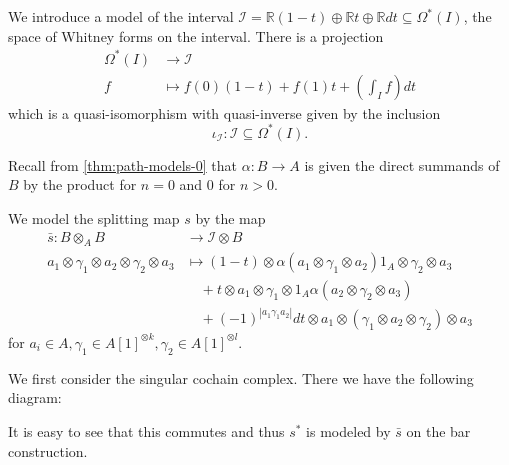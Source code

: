\documentclass{scrartcl}
\theoremstyle{plain}
\theoremstyle{definition}
\newtheorem{remark}[theorem]{Remark}
\newcommand{\R}{\mathbb R}
\newcommand{\Z}{\mathbb Z}
\newcommand{\abs}[1]{\left\lvert#1\right\rvert}
\renewcommand{\subset}{\subseteq}
\begin{document}

We introduce a model of the interval $\mathcal I = \R (1-t) \oplus \R t \oplus \R dt\subset \Omega^*(I)$, the space of Whitney forms on the interval. There is a projection 
\begin{align*}
    \Omega^*(I) &\to \mathcal I\\
    f&\mapsto f(0)(1-t) + f(1) t + \left(\int_I f\right) dt
\end{align*}
which is a quasi-isomorphism with quasi-inverse given by the inclusion $$\iota_{\mathcal I}\colon \mathcal I \subset \Omega^*(I).$$ 

Recall from \cref{thm:path-models-0} that $\alpha\colon B\to A$ is given the direct summands of $B$ by the product for $n=0$ and $0$ for $n>0$.

We model the splitting map $s$ by the map 
\begin{align*}
    \bar s \colon B\otimes_A B&\to \mathcal I\otimes B \\
    a_1 \otimes \gamma_1 \otimes a_2 \otimes \gamma_2 \otimes a_3 &\mapsto  (1-t) \otimes \alpha (a_1 \otimes \gamma_1 \otimes a_2)1_A \otimes \gamma_2 \otimes a_3 \\
    &\quad+ t\otimes a_1 \otimes \gamma_1 \otimes 1_A \alpha (a_2 \otimes \gamma_2 \otimes a_3)  \\
    &\quad +  (-1) ^{\abs{a_1\gamma_1a_2}} dt\otimes a_1 \otimes (\gamma_1\otimes a_2\otimes \gamma_2) \otimes a_3
\end{align*}
for $a_i\in A, \gamma_1\in A[1]^{\otimes k}, \gamma_2\in A[1]^{\otimes l}$.


We first consider the singular cochain complex. There we have the following diagram:
\begin{center}
\end{center}
It is easy to see that this commutes and thus $s^*$ is modeled by $\bar s$ on the bar construction. 
\end{document}

